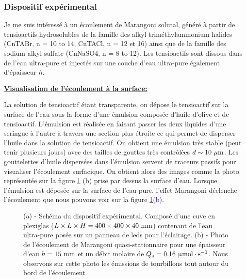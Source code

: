 \documentclass[french, 10pt]{article}
\begin{document}

\subsubsection{Dispositif expérimental}


Je me suis intéressé à un écoulement de Marangoni solutal, généré à partir de tensioactifs hydrosolubles de la famille des alkyl triméthylammonium halides (CnTABr, n = 10 to 14, CnTACl, n = 12 et 16) ainsi que de la famille des sodium alkyl sulfate (CnNaSO4, n = 8 to 12). Les tensioactifs sont dissous dans de l'eau ultra-pure et injectés sur une couche d'eau ultra-pure également d'épaisseur $h$.\medskip

\noindent\underline{\textbf{Visualisation de l'écoulement à la surface:}}\medskip

La solution de tensioactif étant transparente, on dépose le tensioactif sur la surface de l'eau sous la forme d'une émulsion composée d’huile d'olive et de tensioactif. L'émulsion est réalisée en faisant passer les deux liquides d'une seringue à l'autre à travers une section plus étroite ce qui permet de disperser l'huile dans la solution de tensioactif. On obtient une émulsion très stable (peut tenir plusieurs jours) avec des tailles de gouttes très contrôlées $d \sim 10~\rm \mu m$. Les gouttelettes d'huile dispersées dans l'émulsion servent de traceurs passifs pour visualiser l'écoulement surfacique. On obtient alors des images comme la photo représentée sur la figure \ref{fig:Injection1} (b) prise par dessus la surface d'eau. Lorsque l'émulsion est déposée sur la surface de l'eau pure, l'effet Marangoni déclenche l'écoulement que nous pouvons voir sur la figure \ref{fig:Injection1}\textcolor{blue}{(b)}. 

\begin{figure}[!ht]
   \centering
   \resizebox{.8\linewidth}{!}{}
   \caption{(a) - Schéma du dispositif expérimental. Composé d'une cuve en plexiglas ($L\times L\times H=400\times 400 \times 40 ~\rm mm$) contenant de l'eau ultra-pure posée sur un panneau de leds pour l'éclairage. (b) - Photo de l'écoulement de Marangoni quasi-stationnaire pour une épaisseur d'eau $h=15~\rm mm$ et un débit molaire de $Q_{\rm a} = 0.16~\rm \upmu mol\cdot s^{-1}$. Nous observons sur cette photo les émissions de tourbillons tout autour du bord de l'écoulement.}
  \label{fig:Injection1}
\end{figure}
\end{document}

